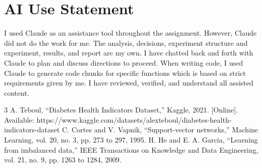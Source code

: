 \documentclass[conference]{IEEEtran}
\begin{document}
\section*{AI Use Statement}

I used Claude as an assistance tool throughout the assignment. However, Claude did not do the work for me. The analysis, decisions, experiment structure and experiment, results, and report are my own. I have chatted back and forth with Claude to plan and discuss directions to proceed. When writing code, I used Claude to generate code chunks for specific functions which is based on strict requirements given by me. I have reviewed, verified, and understand all assisted content. 


\begin{thebibliography}{3}
 A. Teboul, ``Diabetes Health Indicators Dataset,'' Kaggle, 2021. [Online]. Available: https://www.kaggle.com/datasets/alexteboul/diabetes-health-indicators-dataset
 C. Cortes and V. Vapnik, ``Support-vector networks,'' Machine Learning, vol. 20, no. 3, pp. 273 to 297, 1995.
 H. He and E. A. Garcia, ``Learning from imbalanced data,'' IEEE Transactions on Knowledge and Data Engineering, vol. 21, no. 9, pp. 1263 to 1284, 2009.
\end{thebibliography}
\end{document}
